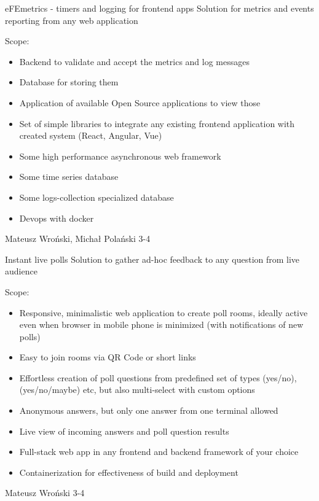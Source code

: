 \begin{project}
{eFEmetrics - timers and logging for frontend apps}
{Solution for metrics and events reporting from any web application}
{
Scope:
\begin{itemize}
	\item Backend to validate and accept the metrics and log messages
	\item Database for storing them
	\item Application of available Open Source applications to view those
	\item Set of simple libraries to integrate any existing frontend application with created system (React, Angular, Vue)
\end{itemize}
}
{
\begin{itemize}
	\item Some high performance asynchronous web framework
	\item Some time series database
	\item Some logs-collection specialized database
	\item Devops with docker
\end{itemize}
}
{Mateusz Wroński, Michał Polański}
{3-4}
\end{project}
\begin{project}
{Instant live polls}
{Solution to gather ad-hoc feedback to any question from live audience}
{
Scope:
\begin{itemize}
	\item Responsive, minimalistic web application to create poll rooms, ideally active even when browser in mobile phone is minimized (with notifications of new polls)
	\item Easy to join rooms via QR Code or short links
	\item Effortless creation of poll questions from predefined set of types (yes/no), (yes/no/maybe) etc, but also multi-select with custom options
	\item Anonymous answers, but only one answer from one terminal allowed
	\item Live view of incoming answers and poll question results
\end{itemize}
}
{
\begin{itemize}
	\item Full-stack web app in any frontend and backend framework of your choice
	\item Containerization for effectiveness of build and deployment
\end{itemize}
}
{Mateusz Wroński}
{3-4}
\end{project}
